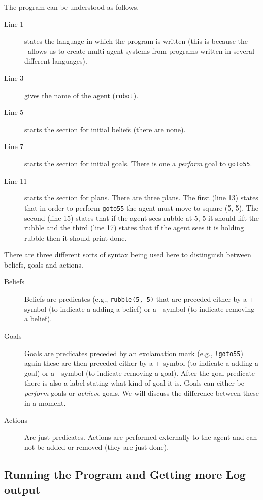 The program can be understood as follows.  
\begin{description}
\item[Line 1] states the language in which the program is written (this is because the \ail\ allows us to create multi-agent systems from programs written in several different languages).  
\item[Line 3] gives the name of the agent (\lstinline{robot}).  
\item[Line 5] starts the section for initial beliefs (there are none).  
\item[Line 7] starts the section for initial goals.  There is one a \emph{perform} goal to \lstinline{goto55}.
\item[Line 11] starts the section for plans.  There are three plans.  The first (line 13) states that in order to perform \lstinline{goto55} the agent must move to square (5, 5).  The second (line 15) states that if the agent sees rubble at 5, 5 it should lift the rubble and the third  (line 17) states that if the agent sees it is holding rubble then it should print done.
\end{description}

There are three different sorts of syntax being used here to distinguish between beliefs, goals and actions.

\begin{description}
\item[Beliefs] Beliefs are predicates (e.g., \lstinline{rubble(5, 5)} that are preceded either by a + symbol (to indicate a adding a belief) or a - symbol (to indicate removing a belief).
\item[Goals] Goals are predicates preceded by an exclamation mark (e.g., \lstinline{!goto55}) again these are then preceded  either by a + symbol (to indicate a adding a goal) or a - symbol (to indicate removing a goal).  After the goal predicate there is also a label stating what kind of goal it is.  Goals can either be \emph{perform} goals or \emph{achieve} goals.  We will discuss the difference between these in a moment.
\item[Actions] Are just predicates.  Actions are performed externally to the agent and can not be added or removed (they are just done).
\end{description}

\subsection{Running the Program and Getting more Log output}

